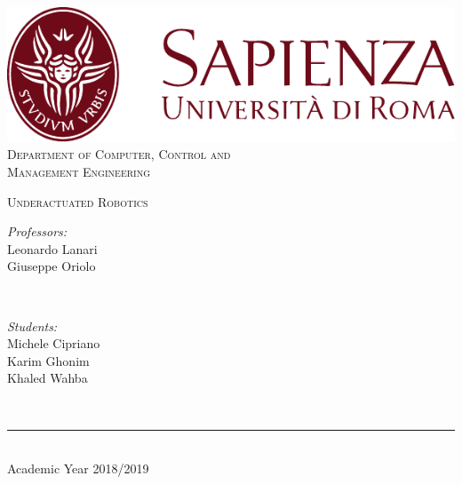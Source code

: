 \documentclass[a4paper]{article}
\begin{document}
\begin{titlepage}
	\centering
    \vspace*{0.5 cm}
    \includegraphics[scale = 0.75]{images/SapienzaLogo}\\[1.0 cm]	%

    \vspace*{-0.4cm}
    \textsc{\large Department of Computer, Control and\\Management Engineering}\\[2.0 cm]	%
    \vspace*{1cm}

    { \fontsize{20.74pt}{18.5pt}\selectfont\bfseries \thetitle \par } %

    \vspace*{0.25cm}
    \textsc{\Large Underactuated Robotics}\\[0.5 cm] %

    \vspace*{2.6cm}
	\begin{minipage}{0.4\textwidth}
		\begin{flushleft} \large
			\emph{Professors:}\\
			Leonardo Lanari\\
      Giuseppe Oriolo\\
		\end{flushleft}
	\end{minipage}~
	\begin{minipage}{0.4\textwidth}
		\begin{flushright} \large
			\emph{Students:} \\
			Michele Cipriano\\
            Karim Ghonim\\
            Khaled Wahba\\
            \vspace*{0.2cm}
		\end{flushright}
	\end{minipage}\\[3.85 cm]

    \vspace{0.2cm}
    \rule{\linewidth}{0.2 mm} \\[0.3 cm]
    \vspace*{-0.3cm}
    Academic Year 2018/2019
\end{titlepage}
\end{document}

